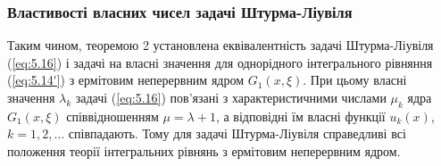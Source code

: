 
\subsubsection{Властивості власних чисел задачі Штурма-Ліувіля}

Таким чином, теоремою 2 установлена еквівалентність задачі Штурма-Ліувіля (\ref{eq:5.16}) і задачі на власні значення для однорідного інтегрального рівняння (\ref{eq:5.14'}) з ермітовим неперервним ядром $G_1(x, \xi)$. При цьому власні значення $\lambda_k$ задачі (\ref{eq:5.16}) пов’язані з характеристичними числами $\mu_k$ ядра $G_1(x, \xi)$ співвідношенням $\mu = \lambda + 1$, а відповідні їм власні функції $u_k(x)$, $k = 1, 2, \ldots$ співпадають. Тому для задачі Штурма-Ліувіля справедливі всі положення теорії інтегральних рівнянь з ермітовим неперервним ядром. \\

